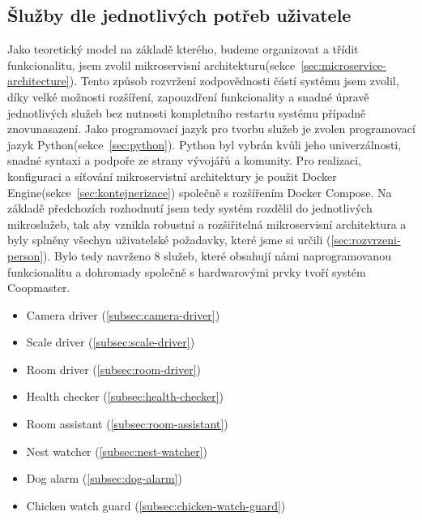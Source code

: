 \subsection{Šlužby dle jednotlivých potřeb uživatele}\label{subsec:microservices}
Jako teoretický model na základě kterého, budeme organizovat a třídit funkcionalitu, jsem zvolil mikroservisní architekturu(sekce~\ref{sec:microservice-architecture}).
Tento způsob rozvržení zodpovědnosti částí systému jsem zvolil, díky velké možnosti rozšíření, zapouzdření funkcionality a snadné úpravě jednotlivých služeb bez nutnosti kompletního restartu systému případně znovunasazení.\newline
Jako programovací jazyk pro tvorbu služeb je zvolen programovací jazyk Python(sekce~\ref{sec:python}).
Python byl vybrán kvůli jeho univerzálnosti, snadné syntaxi a podpoře ze strany vývojářů a komunity.\newline
Pro realizaci, konfiguraci a síťování mikroservistní architektury je použit Docker Engine(sekce~\ref{sec:kontejnerizace}) společně s rozšířením Docker Compose.\newline
Na základě předchozích rozhodnutí jsem tedy systém rozdělil do jednotlivých mikroslužeb, tak aby vznikla robustní a rozšiřitelná mikroservisní architektura a byly splněny všechyn uživatelské požadavky, které jsme si určili (\ref{sec:rozvrzeni-person}).\newline
Bylo tedy navrženo 8 služeb, které obsahují námi naprogramovanou funkcionalitu a dohromady společně s hardwarovými prvky tvoří systém Coopmaster.
\begin{itemize}
    \item Camera driver (\ref{subsec:camera-driver})
    \item Scale driver (\ref{subsec:scale-driver})
    \item Room driver (\ref{subsec:room-driver})
    \item Health checker (\ref{subsec:health-checker})
    \item Room assistant (\ref{subsec:room-assistant})
    \item Nest watcher (\ref{subsec:nest-watcher})
    \item Dog alarm (\ref{subsec:dog-alarm})
    \item Chicken watch guard (\ref{subsec:chicken-watch-guard})
\end{itemize}

